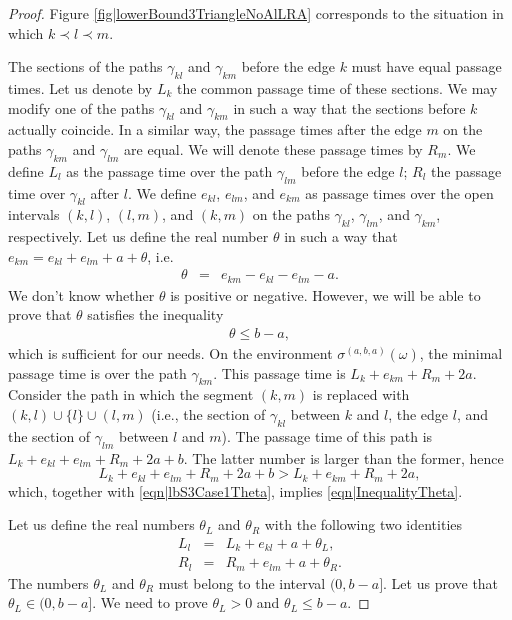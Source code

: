 \documentclass[reqno]{amsart}
\begin{document}
\begin{proof}
 Figure \ref{fig|lowerBound3TriangleNoAlLRA} corresponds to the situation in which $k\prec l\prec m$. 
 
The sections of the paths $\gamma_{kl}$ and $\gamma_{km}$ before the edge $k$ must have equal passage times. Let us denote by $L_k$ the common passage time of these sections. We may modify one of the paths $\gamma_{kl}$ and $\gamma_{km}$ in such a way that the sections before $k$ actually coincide. In a similar way, the passage times after the edge $m$ on the paths $\gamma_{km}$ and $\gamma_{lm}$ are equal. We will denote these passage times by $R_m$. We define $L_l$ as the passage time over the path $\gamma_{lm}$ before the edge $l$; $R_l$ the passage time over $\gamma_{kl}$ after $l$. We define $e_{kl}$, $e_{lm}$, and $e_{km}$ as passage times over the open intervals $(k,l)$, $(l,m)$, and $(k,m)$ on the paths 
$\gamma_{kl}$, $\gamma_{lm}$, and $\gamma_{km}$, respectively. Let us define the real number $\theta$ in such a way that $e_{km} =e_{kl}+e_{lm}+a+\theta$, i.e.
\begin{eqnarray} \theta &=&
e_{km} -e_{kl}-e_{lm}-a
 .\label{eqn|lbS3Case1Theta}\end{eqnarray} 
We don't know whether $\theta$ is positive or negative. However, we will
be able to prove that $\theta$ satisfies the inequality 
\begin{eqnarray}\theta\leq b-a,\label{eqn|InequalityTheta}\end{eqnarray}
which is sufficient for our needs. 
On the environment $\sigma^{(a,b,a)}(\omega)$, the minimal passage time is over the path $\gamma_{km}$. This passage time is $L_k+e_{km}+R_m+2a$. 
Consider the path in which the segment $(k,m)$ is replaced with $(k,l)\cup \{l\}\cup (l,m)$ (i.e., the section of $\gamma_{kl}$ between $k$ and $l$, the edge $l$, and 
the section of $\gamma_{lm}$ between $l$ and $m$). The passage time of this path is 
$L_k+e_{kl}+e_{lm}+R_m+2a+b$. The latter number is larger than the former, hence 
\[L_k+e_{kl}+e_{lm}+R_m+2a+b>L_k+e_{km}+R_m+2a,\]
which, together with \eqref{eqn|lbS3Case1Theta}, implies \eqref{eqn|InequalityTheta}.

Let us define the real numbers $\theta_L$ and $\theta_R$ with the following two identities
\begin{eqnarray}
L_l&=&L_k+e_{kl}+a+\theta_L,\label{eqn|lbS3Case1ThetaL}\\
R_l&=&R_m+e_{lm}+a+\theta_R.\label{eqn|lbS3Case1ThetaR}
\end{eqnarray}
The numbers $\theta_L$ and $\theta_R$ must belong to the interval $(0,b-a]$. Let us prove that $\theta_L\in(0,b-a]$. We need to prove $\theta_L>0$ and $\theta_L\leq b-a$. 


\end{proof}
\end{document}
